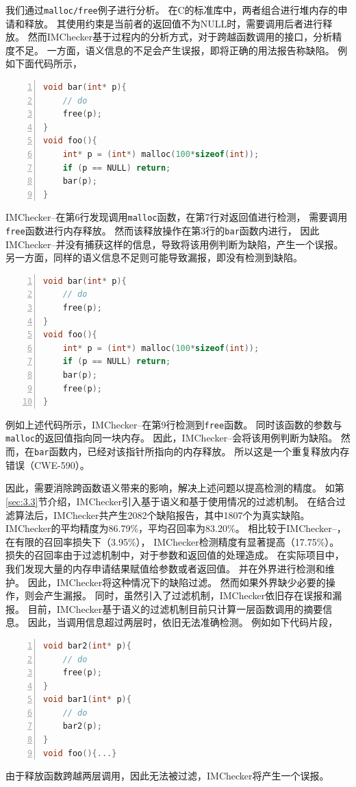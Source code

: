 我们通过\texttt{malloc/free}例子进行分析。
在C的标准库中，两者组合进行堆内存的申请和释放。
其使用约束是当前者的返回值不为NULL时，需要调用后者进行释放。
然而IMChecker基于过程内的分析方式，对于跨越函数调用的接口，分析精度不足。
一方面，语义信息的不足会产生误报，即将正确的用法报告称缺陷。
例如下面代码所示，
\begin{lstlisting}[language={C},
basicstyle=\linespread{0.7}\listingsfont,
numbers=left,
xleftmargin=.2\textwidth]
void bar(int* p){
	// do
	free(p);
}
void foo(){
	int* p = (int*) malloc(100*sizeof(int));
	if (p == NULL) return;
	bar(p);
}
\end{lstlisting}
IMChecker--在第6行发现调用\texttt{malloc}函数，在第7行对返回值进行检测，
需要调用\texttt{free}函数进行内存释放。
然而该释放操作在第3行的\texttt{bar}函数内进行，
因此IMChecker--并没有捕获这样的信息，导致将该用例判断为缺陷，产生一个误报。
另一方面，同样的语义信息不足则可能导致漏报，即没有检测到缺陷。
\begin{lstlisting}[language={C},
basicstyle=\linespread{0.7}\listingsfont,
numbers=left,
xleftmargin=.2\textwidth]
void bar(int* p){
	// do
	free(p);
}
void foo(){
	int* p = (int*) malloc(100*sizeof(int));
	if (p == NULL) return;
	bar(p);
	free(p);
}
\end{lstlisting}
例如上述代码所示，IMChecker--在第9行检测到\texttt{free}函数。
同时该函数的参数与\texttt{malloc}的返回值指向同一块内存。
因此，IMChecker--会将该用例判断为缺陷。
然而，在\texttt{bar}函数内，已经对该指针所指向的内存释放。
所以这是一个重复释放内存错误（CWE-590）。

因此，需要消除跨函数语义带来的影响，解决上述问题以提高检测的精度。
如第\ref{sec:3.3}节介绍，IMChecker引入基于语义和基于使用情况的过滤机制。
在结合过滤算法后，IMChecker共产生2082个缺陷报告，其中1807个为真实缺陷。
IMChecker的平均精度为86.79\%，平均召回率为83.20\%。
相比较于IMChecker--，在有限的召回率损失下（3.95\%），
IMChecker检测精度有显著提高（17.75\%）。
损失的召回率由于过滤机制中，对于参数和返回值的处理造成。
在实际项目中，我们发现大量的内存申请结果赋值给参数或者返回值。
并在外界进行检测和维护。
因此，IMChecker将这种情况下的缺陷过滤。
然而如果外界缺少必要的操作，则会产生漏报。
同时，虽然引入了过滤机制，IMChecker依旧存在误报和漏报。
目前，IMChecker基于语义的过滤机制目前只计算一层函数调用的摘要信息。
因此，当调用信息超过两层时，依旧无法准确检测。
例如如下代码片段，
\begin{lstlisting}[language={C},
basicstyle=\linespread{0.7}\listingsfont,
numbers=left,
xleftmargin=.2\textwidth]
void bar2(int* p){        
	// do						   
	free(p);					  
}
void bar1(int* p){        
	// do						   
	bar2(p);					  
}
void foo(){...}
\end{lstlisting}
由于释放函数跨越两层调用，因此无法被过滤，IMChecker将产生一个误报。


